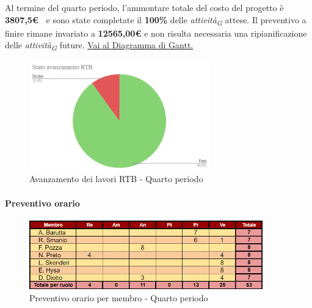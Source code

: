 \vspace{1cm}

Al termine del quarto periodo, l'ammontare totale del costo del progetto è \textbf{ 3807,5\euro\ } e sono state completate il \textbf{100\%} delle \textit{attività}\textsubscript{\textit{G}} attese.
Il preventivo a finire rimane invariato a \textbf{12565,00€} e non risulta necessaria una ripianificazione delle \textit{attività}\textsubscript{\textit{G}} future.
\href{https://github.com/orgs/ByteOps-swe/projects/3/views/1?sortedBy%5Bdirection%5D=asc&sortedBy%5BcolumnId%5D=64182560}{Vai al Diagramma di Gantt.}

\pagebreak

\begin{figure}[H]
    \centering
    \begin{minipage}[b]{0.70\textwidth}
        \centering
        \includegraphics[width=0.7\textwidth]{../Images/avanzamento4Periodo.png}
        \caption{Avanzamento dei lavori RTB - Quarto periodo}
        \label{fig:Avanzamento_RTB_4}
    \end{minipage}
\end{figure}

\paragraph{Preventivo orario} 

\begin{figure}[H]
    \centering
    \includegraphics[width=0.9\textwidth]{../Images/preventivoOrario4Periodo.png}
    \caption{Preventivo orario per membro - Quarto periodo}
    \label{fig:Preventivo_orario_4}
\end{figure}


